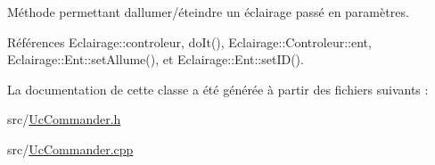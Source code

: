 Méthode permettant d\textquotesingle{}allumer/éteindre un éclairage passé en paramètres. 

Références Eclairage\+::controleur, do\+It(), Eclairage\+::\+Controleur\+::ent, Eclairage\+::\+Ent\+::set\+Allume(), et Eclairage\+::\+Ent\+::set\+I\+D().



La documentation de cette classe a été générée à partir des fichiers suivants \+:\begin{DoxyCompactItemize}
\item 
src/\hyperlink{UcCommander_8h}{Uc\+Commander.\+h}\item 
src/\hyperlink{UcCommander_8cpp}{Uc\+Commander.\+cpp}\end{DoxyCompactItemize}
